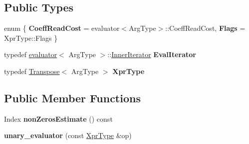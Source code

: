 \subsection*{Public Types}
\begin{DoxyCompactItemize}
\item 
\mbox{\label{struct_eigen_1_1internal_1_1unary__evaluator_3_01_transpose_3_01_arg_type_01_4_00_01_iterator_based_01_4_a91469a74d8cc69184dd26440bbf8d453}} 
enum \{ {\bfseries Coeff\+Read\+Cost} = evaluator$<$Arg\+Type$>$\+::Coeff\+Read\+Cost, 
{\bfseries Flags} = Xpr\+Type\+::Flags
 \}
\item 
\mbox{\label{struct_eigen_1_1internal_1_1unary__evaluator_3_01_transpose_3_01_arg_type_01_4_00_01_iterator_based_01_4_aac683dac39921323bcc00b3a49b7d20c}} 
typedef \mbox{\hyperlink{struct_eigen_1_1internal_1_1evaluator}{evaluator}}$<$ Arg\+Type $>$\+::\mbox{\hyperlink{class_eigen_1_1_inner_iterator}{Inner\+Iterator}} {\bfseries Eval\+Iterator}
\item 
\mbox{\label{struct_eigen_1_1internal_1_1unary__evaluator_3_01_transpose_3_01_arg_type_01_4_00_01_iterator_based_01_4_ac44f8c6163e7d7d86b6522422953e32d}} 
typedef \mbox{\hyperlink{class_eigen_1_1_transpose}{Transpose}}$<$ Arg\+Type $>$ {\bfseries Xpr\+Type}
\end{DoxyCompactItemize}
\subsection*{Public Member Functions}
\begin{DoxyCompactItemize}
\item 
\mbox{\label{struct_eigen_1_1internal_1_1unary__evaluator_3_01_transpose_3_01_arg_type_01_4_00_01_iterator_based_01_4_a9a2a46bb192c501a3dc3295e74fd1841}} 
Index {\bfseries non\+Zeros\+Estimate} () const
\item 
\mbox{\label{struct_eigen_1_1internal_1_1unary__evaluator_3_01_transpose_3_01_arg_type_01_4_00_01_iterator_based_01_4_a26958ea8d8a6371e9342f3f275df2626}} 
{\bfseries unary\+\_\+evaluator} (const \mbox{\hyperlink{class_eigen_1_1_transpose}{Xpr\+Type}} \&op)
\end{DoxyCompactItemize}
